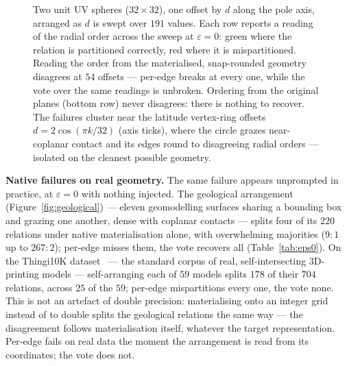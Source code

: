 \documentclass{egpubl}
\begin{document}
\begin{figure}[t]
\centering

\caption{Two unit UV spheres ($32{\times}32$), one offset by $d$ along the pole axis, arranged as $d$ is swept over $191$ values. Each row reports a reading of the radial order across the sweep at $\varepsilon = 0$: green where the relation is partitioned correctly, red where it is mispartitioned. Reading the order from the materialised, snap-rounded geometry disagrees at $54$ offsets --- per-edge breaks at every one, while the vote over the same readings is unbroken. Ordering from the original planes (bottom row) never disagrees: there is nothing to recover. The failures cluster near the latitude vertex-ring offsets $d = 2\cos(\pi k/32)$ (axis ticks), where the circle grazes near-coplanar contact and its edges round to disagreeing radial orders --- isolated on the cleanest possible geometry.}
\label{fig:sphere_offset}
\end{figure}

\textbf{Native failures on real geometry.} The same failure appears unprompted in practice, at $\varepsilon = 0$ with nothing injected. The geological arrangement (Figure~\ref{fig:geological}) --- eleven geomodelling surfaces sharing a bounding box and grazing one another, dense with coplanar contacts --- splits four of its $220$ relations under native materialisation alone, with overwhelming majorities ($9{:}1$ up to $267{:}2$); per-edge misses them, the vote recovers all (Table~\ref{tab:eps0}). On the Thingi10K dataset~\cite{Thingi10K} --- the standard corpus of real, self-intersecting 3D-printing models --- self-arranging each of $59$ models splits $178$ of their $704$ relations, across $25$ of the $59$; per-edge mispartitions every one, the vote none. This is not an artefact of double precision: materialising onto an integer grid instead of to double splits the geological relations the same way --- the disagreement follows materialisation itself, whatever the target representation. Per-edge fails on real data the moment the arrangement is read from its coordinates; the vote does not.
\end{document}
